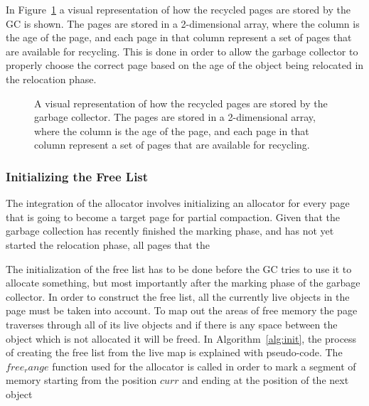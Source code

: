 In Figure~\ref{fig:generational_free_list_dict} a visual representation of how the recycled pages are stored by the GC is shown. The pages are stored in a 2-dimensional array, where the column is the age of the page, and each page in that column represent a set of pages that are available for recycling. This is done in order to allow the garbage collector to properly choose the correct page based on the age of the object being relocated in the relocation phase.

\begin{figure}[H]
    \centering
    
    \caption{A visual representation of how the recycled pages are stored by the garbage collector. The pages are stored in a 2-dimensional array, where the column is the age of the page, and each page in that column represent a set of pages that are available for recycling.}
    \label{fig:generational_free_list_dict}
\end{figure}

\subsubsection{Initializing the Free List}
\label{sec:implement-init}
The integration of the allocator involves initializing an allocator for every page that is going to become a target page for partial compaction. Given that the garbage collection has recently finished the marking phase, and has not yet started the relocation phase, all pages that the 

The initialization of the free list has to be done before the GC tries to use it to allocate something, but most importantly after the marking phase of the garbage collector. In order to construct the free list, all the currently live objects in the page must be taken into account. To map out the areas of free memory the page traverses through all of its live objects and if there is any space between the object which is not allocated it will be freed. In Algorithm~\ref{alg:init}, the process of creating the free list from the live map is explained with pseudo-code. The $free_range$ function used for the allocator is called in order to mark a segment of memory starting from the position $curr$ and ending at the position of the next object 


